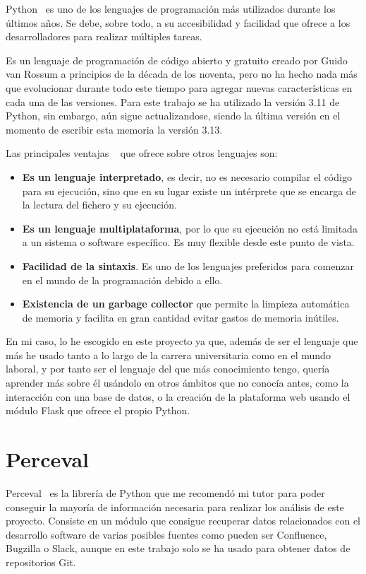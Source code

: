 \documentclass[a4paper, 12pt]{book}
\begin{document}
Python~\cite{python:_python} es uno de los lenguajes de programación más utilizados durante los últimos años. Se debe, sobre todo, a su accesibilidad y facilidad que ofrece a los desarrolladores para realizar múltiples tareas.

Es un lenguaje de programación de código abierto y gratuito creado por Guido van Rossum a principios de la década de los noventa, pero no ha hecho nada más que evolucionar durante todo este tiempo para agregar nuevas características en cada una de las versiones. Para este trabajo se ha utilizado la versión 3.11 de Python, sin embargo, aún sigue actualizandose, siendo la última versión en el momento de escribir esta memoria la versión 3.13.

Las principales ventajas ~\cite{fernandez:_python} que ofrece sobre otros lenguajes son:

\begin{itemize}
  \item \textbf{Es un lenguaje interpretado}, es decir, no es necesario compilar el código para su ejecución, sino que en su lugar existe un intérprete que se encarga de la lectura del fichero y su ejecución.
  \item \textbf{Es un lenguaje multiplataforma}, por lo que su ejecución no está limitada a un sistema o software específico. Es muy flexible desde este punto de vista.
  \item \textbf{Facilidad de la sintaxis}. Es uno de los lenguajes preferidos para comenzar en el mundo de la programación debido a ello.
  \item \textbf{Existencia de un garbage collector} que permite la limpieza automática de memoria y facilita en gran cantidad evitar gastos de memoria inútiles.
\end{itemize}

En mi caso, lo he escogido en este proyecto ya que, además de ser el lenguaje que más he usado tanto a lo largo de la carrera universitaria como en el mundo laboral, y por tanto ser el lenguaje del que más conocimiento tengo, quería aprender más sobre él usándolo en otros ámbitos que no conocía antes, como la interacción con una base de datos, o la creación de la plataforma web usando el módulo Flask que ofrece el propio Python.

\section{Perceval}
\label{sec:Perceval}
Perceval~\cite{perceval:_perceval} es la librería de Python que me recomendó mi tutor para poder conseguir la mayoría de información necesaria para realizar los análisis de este proyecto. Consiste en un módulo que consigue recuperar datos relacionados con el desarrollo software de varias posibles fuentes como pueden ser Confluence, Bugzilla o Slack, aunque en este trabajo solo se ha usado para obtener datos de repositorios Git.
\end{document}
